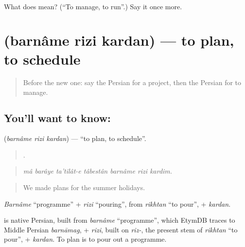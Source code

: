 \begin{tcolorbox}[breakable,colback=teal!4,colframe=teal!35!black,title={Before you move on}]
What does   mean? (\textquotedblleft{}To manage, to run\textquotedblright{}.) Say it once more.
\end{tcolorbox}
\section[\texorpdfstring{\fa{برنامه} \fa{ریزی} \fa{کردن} (barnâme rizi kardan)}{برنامه ریزی کردن (barnâme rizi kardan)}]{   (barnâme rizi kardan) — to plan, to schedule}

\label{lesson:FA-C382-barname-rizi-kardan}



\begin{quote}
Before the new one: say the Persian for a project, then the Persian for to manage.
\end{quote}

\subsection*{You'll want to know:   }
\textbf{  } (\emph{barnâme rizi kardan}) — \textquotedblleft{}to plan, to schedule\textquotedblright{}.

\begin{quote}
      .
\end{quote}

\begin{quote}
\emph{mâ barâye ta'tilât-e tâbestân barnâme rizi kardim.}
\end{quote}

\begin{quote}
We made plans for the summer holidays.
\end{quote}

\emph{Barnâme} \textquotedblleft{}programme\textquotedblright{} + \emph{rizi} \textquotedblleft{}pouring\textquotedblright{}, from \emph{rikhtan} \textquotedblleft{}to pour\textquotedblright{}, + \emph{kardan}.

\begin{cousinweb}
\textbf{  } is native Persian, built from \emph{barnâme} \textquotedblleft{}programme\textquotedblright{}, which EtymDB traces to Middle Persian \emph{barnāmag}, + \emph{rizi}, built on \emph{riz-}, the present stem of \emph{rikhtan} \textquotedblleft{}to pour\textquotedblright{}, + \emph{kardan}. To plan is to pour out a programme.
\end{cousinweb}

